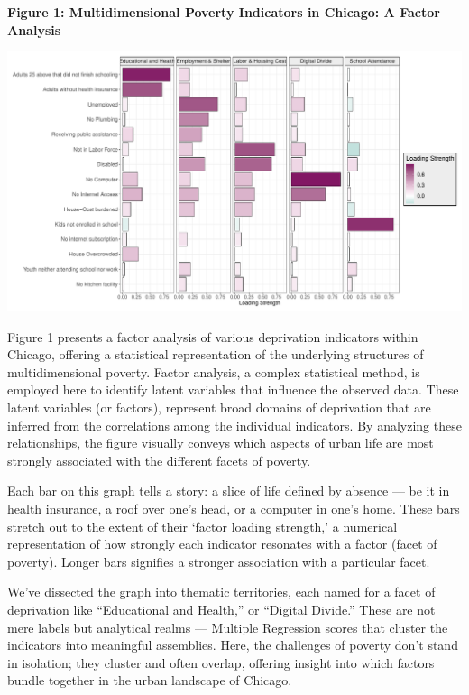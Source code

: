 \documentclass[
  letterpaper,
  DIV=11,
  numbers=noendperiod]{scrreprt}
\begin{document}
\textbf{Figure 1: Multidimensional Poverty Indicators in Chicago: A
Factor Analysis}

\includegraphics{index_files/figure-pdf/viz1-1.pdf}

Figure 1 presents a factor analysis of various deprivation indicators
within Chicago, offering a statistical representation of the underlying
structures of multidimensional poverty. Factor analysis, a complex
statistical method, is employed here to identify latent variables that
influence the observed data. These latent variables (or factors),
represent broad domains of deprivation that are inferred from the
correlations among the individual indicators. By analyzing these
relationships, the figure visually conveys which aspects of urban life
are most strongly associated with the different facets of poverty.

Each bar on this graph tells a story: a slice of life defined by absence
--- be it in health insurance, a roof over one's head, or a computer in
one's home. These bars stretch out to the extent of their `factor
loading strength,' a numerical representation of how strongly each
indicator resonates with a factor (facet of poverty). Longer bars
signifies a stronger association with a particular facet.

We've dissected the graph into thematic territories, each named for a
facet of deprivation like ``Educational and Health,'' or ``Digital
Divide.'' These are not mere labels but analytical realms --- Multiple
Regression scores that cluster the indicators into meaningful
assemblies. Here, the challenges of poverty don't stand in isolation;
they cluster and often overlap, offering insight into which factors
bundle together in the urban landscape of Chicago.

\end{document}
